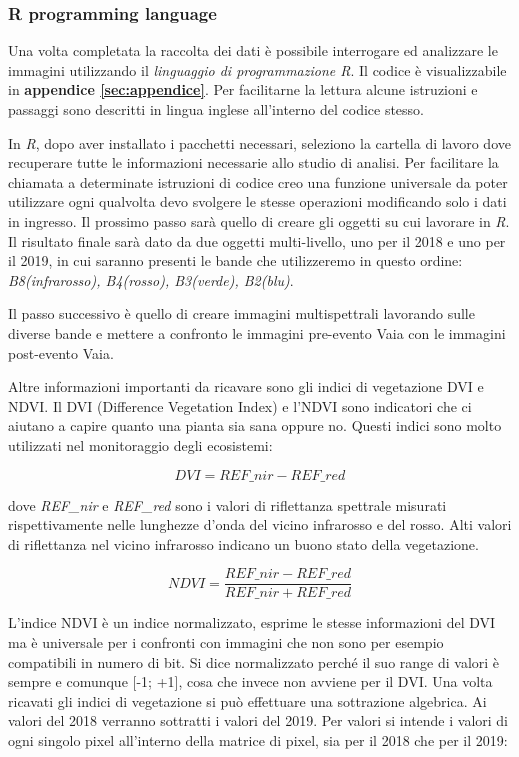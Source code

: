 \documentclass[a4paper,12pt]{article}
\begin{document}
\subsubsection{R programming language}

Una volta completata la raccolta dei dati è possibile interrogare ed analizzare le immagini utilizzando il \textit{linguaggio di programmazione R}. Il codice è visualizzabile in \textbf{appendice \ref{sec:appendice}}. Per facilitarne la lettura alcune istruzioni e passaggi sono descritti in lingua inglese all'interno del codice stesso.

In \textit{R}, dopo aver installato i pacchetti necessari, seleziono la cartella di lavoro dove recuperare tutte le informazioni necessarie allo studio di analisi. Per facilitare la chiamata a determinate istruzioni di codice creo una funzione universale da poter utilizzare ogni qualvolta devo svolgere le stesse operazioni modificando solo i dati in ingresso. Il prossimo passo sarà quello di creare gli oggetti su cui lavorare in \textit{R}. Il risultato finale sarà dato da due oggetti multi-livello, uno per il 2018 e uno per il 2019, in cui saranno presenti le bande che utilizzeremo in questo ordine: \textit{B8(infrarosso), B4(rosso), B3(verde), B2(blu)}.

Il passo successivo è quello di creare immagini multispettrali lavorando sulle diverse bande e mettere a confronto le immagini pre-evento Vaia con le immagini post-evento Vaia. 

Altre informazioni importanti da ricavare sono gli indici di vegetazione DVI e NDVI. Il DVI (Difference Vegetation Index) e l'NDVI sono indicatori che ci aiutano a capire quanto una pianta sia sana oppure no. Questi indici sono molto utilizzati nel monitoraggio degli ecosistemi:

\begin{equation}
    DVI = {REF\_nir -  REF\_red}
    \label{eq:DVI}
\end{equation}

dove \textit{REF\_nir} e \textit{REF\_red} sono i valori di riflettanza spettrale misurati rispettivamente nelle lunghezze d'onda del vicino infrarosso e del rosso. Alti valori di riflettanza nel vicino infrarosso indicano un buono stato della vegetazione.

\begin{equation}
    NDVI = \frac{REF\_nir - REF\_red}{REF\_nir + REF\_red}
    \label{eq:NDVI}
\end{equation}

L'indice NDVI è un indice normalizzato, esprime le stesse informazioni del DVI ma è universale per i confronti con immagini che non sono per esempio compatibili in numero di bit. Si dice normalizzato perché il suo range di valori è sempre e comunque [-1; +1], cosa che invece non avviene per il DVI. Una volta ricavati gli indici di vegetazione si può effettuare una sottrazione algebrica. Ai valori del 2018 verranno sottratti i valori del 2019. Per valori si intende i valori di ogni singolo pixel all'interno della matrice di pixel, sia per il 2018 che per il 2019:
\end{document}
